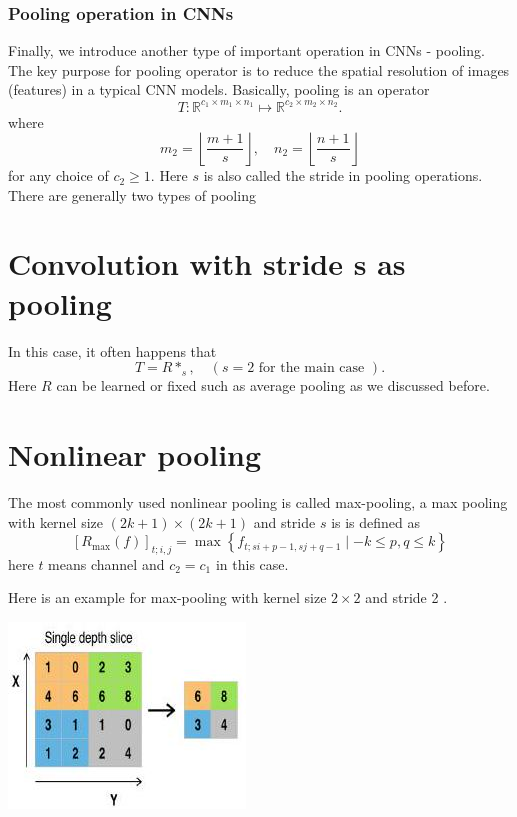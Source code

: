 \documentclass[10pt]{article}
\begin{document}
\subsubsection{Pooling operation in CNNs}
Finally, we introduce another type of important operation in CNNs - pooling. The key purpose for pooling operator is to reduce the spatial resolution of images (features) in a typical CNN models. Basically, pooling is an operator
$$
T: \mathbb{R}^{c_{1} \times m_{1} \times n_{1}} \mapsto \mathbb{R}^{c_{2} \times m_{2} \times n_{2}} .
$$
where
$$
m_{2}=\left\lfloor\frac{m+1}{s}\right\rfloor, \quad n_{2}=\left\lfloor\frac{n+1}{s}\right\rfloor
$$
for any choice of $c_{2} \geq 1$. Here $s$ is also called the stride in pooling operations. There are generally two types of pooling

\section{Convolution with stride s as pooling}
In this case, it often happens that
$$
T=R *_{s}, \quad(s=2 \text { for the main case }) .
$$
Here $R$ can be learned or fixed such as average pooling as we discussed before.

\section{Nonlinear pooling}
The most commonly used nonlinear pooling is called max-pooling, a max pooling with kernel size $(2 k+1) \times(2 k+1)$ and stride $s$ is is defined as
$$
\left[R_{\max }(f)\right]_{t ; i, j}=\max \left\{f_{t ; s i+p-1, s j+q-1} \mid-k \leq p, q \leq k\right\}
$$
here $t$ means channel and $c_{2}=c_{1}$ in this case.

Here is an example for max-pooling with kernel size $2 \times 2$ and stride 2 .

\includegraphics[max width=\textwidth]{2022_01_06_b5ce182ed1bd5f482e5bg-07}
\end{document}
